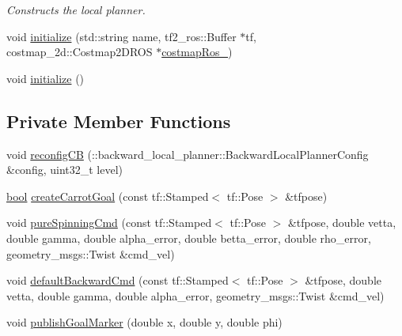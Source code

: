 \begin{DoxyCompactItemize}
\begin{DoxyCompactList}\small\item\em Constructs the local planner. \end{DoxyCompactList}\item 
void \hyperlink{classmove__base__z__client_1_1backward__local__planner_1_1BackwardLocalPlanner_ad31278d3b0f2d990c5e5fe440809c864}{initialize} (std\+::string name, tf2\+\_\+ros\+::\+Buffer $\ast$tf, costmap\+\_\+2d\+::\+Costmap2\+D\+R\+OS $\ast$\hyperlink{classmove__base__z__client_1_1backward__local__planner_1_1BackwardLocalPlanner_a865618f84238fe6ff437d1e38ec5fec0}{costmap\+Ros\+\_\+})
\item 
void \hyperlink{classmove__base__z__client_1_1backward__local__planner_1_1BackwardLocalPlanner_acdb083587fd77dc2c8d617751ac08f74}{initialize} ()
\end{DoxyCompactItemize}
\subsection*{Private Member Functions}
\begin{DoxyCompactItemize}
\item 
void \hyperlink{classmove__base__z__client_1_1backward__local__planner_1_1BackwardLocalPlanner_a9dfe3fd3fd7a0c8ec414a78e1300d09c}{reconfig\+CB} (\+::backward\+\_\+local\+\_\+planner\+::\+Backward\+Local\+Planner\+Config \&config, uint32\+\_\+t level)
\item 
\hyperlink{classbool}{bool} \hyperlink{classmove__base__z__client_1_1backward__local__planner_1_1BackwardLocalPlanner_a0a48c91cb8043aa15d01eec4931e8552}{create\+Carrot\+Goal} (const tf\+::\+Stamped$<$ tf\+::\+Pose $>$ \&tfpose)
\item 
void \hyperlink{classmove__base__z__client_1_1backward__local__planner_1_1BackwardLocalPlanner_a3b08865dc8e19750273d971336ecba3b}{pure\+Spinning\+Cmd} (const tf\+::\+Stamped$<$ tf\+::\+Pose $>$ \&tfpose, double vetta, double gamma, double alpha\+\_\+error, double betta\+\_\+error, double rho\+\_\+error, geometry\+\_\+msgs\+::\+Twist \&cmd\+\_\+vel)
\item 
void \hyperlink{classmove__base__z__client_1_1backward__local__planner_1_1BackwardLocalPlanner_a9f3977494d5f80884eb1a1d09b5b4673}{default\+Backward\+Cmd} (const tf\+::\+Stamped$<$ tf\+::\+Pose $>$ \&tfpose, double vetta, double gamma, double alpha\+\_\+error, geometry\+\_\+msgs\+::\+Twist \&cmd\+\_\+vel)
\item 
void \hyperlink{classmove__base__z__client_1_1backward__local__planner_1_1BackwardLocalPlanner_a691e565d33666d2f7004e791cae29b42}{publish\+Goal\+Marker} (double x, double y, double phi)
\end{DoxyCompactItemize}
